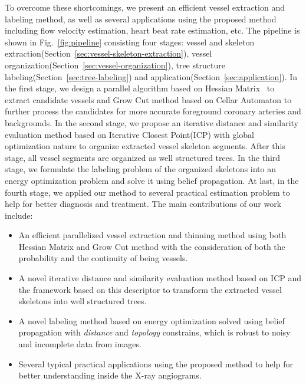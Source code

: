 \documentclass[journal]{IEEEtran}
\begin{document}
To overcome these shortcomings, we present an efficient vessel extraction and labeling method, as well as several applications using the proposed method including flow velocity estimation, heart beat rate estimation, etc. The pipeline is shown in Fig.~\ref{fig:pipeline} consisting four stages: vessel and skeleton extraction(Section~\ref{sec:vessel-skeleton-extraction}), vessel organization(Section~\ref{sec:vessel-organization}), tree structure labeling(Section~\ref{sec:tree-labeling}) and application(Section~\ref{sec:application}). In the first stage, we design a parallel algorithm based on Hessian Matrix~\cite{Frangi} to extract candidate vessels and Grow Cut method based on Cellar Automaton to further process the candidates for more accurate foreground coronary arteries and backgrounds. In the second stage, we propose an iterative distance and similarity evaluation method based on Iterative Closest Point(ICP) with global optimization nature to organize extracted vessel skeleton segments. After this stage, all vessel segments are organized as well structured trees. In the third stage, we formulate the labeling problem of the organized skeletons into an energy optimization problem and solve it using belief propagation. At last, in the fourth stage, we applied our method to several practical estimation problem to help for better diagnosis and treatment. The main contributions of our work include:
\begin{itemize}
\item An efficient parallelized vessel extraction and thinning method using both Hessian Matrix and Grow Cut method with the consideration of both the probability and the continuity of being vessels.

\item A novel iterative distance and similarity evaluation method based on ICP and the framework based on this descriptor to transform the extracted vessel skeletons into well structured trees.

\item A novel labeling method based on energy optimization solved using belief propagation with \textit{distance} and \textit{topology} constrains, which is robust to noisy and incomplete data from images.

\item Several typical practical applications using the proposed method to help for better understanding inside the X-ray angiograms.
\end{itemize}
\end{document}
